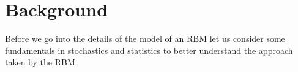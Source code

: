 \documentclass[crop=false,10pt]{standalone}
\begin{document}
  \section{Background} %
  \label{sec:Background}
    Before we go into the details of the model of an RBM let us consider some fundamentals in stochastics and statistics to better understand the approach taken by the RBM.
\end{document}
